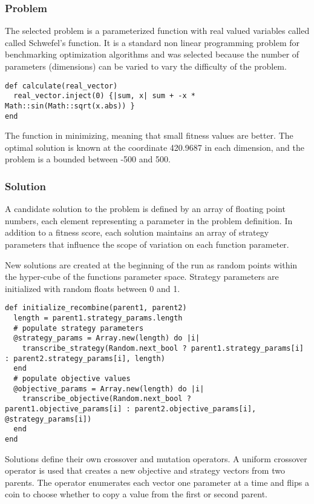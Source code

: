 \subsubsection{Problem}
The selected problem is a parameterized function with real valued variables called called Schwefel's function. It is a standard non linear programming problem for benchmarking optimization algorithms and was selected because the number of parameters (dimensions) can be varied to vary the difficulty of the problem.

\begin{lstlisting}
def calculate(real_vector)
  real_vector.inject(0) {|sum, x| sum + -x * Math::sin(Math::sqrt(x.abs)) }
end
\end{lstlisting}

The function in minimizing, meaning that small fitness values are better. The optimal solution is known at the coordinate 420.9687 in each dimension, and the problem is a bounded between -500 and 500. 

\subsubsection{Solution}
A candidate solution to the problem is defined by an array of floating point numbers, each element representing a parameter in the problem definition. In addition to a fitness score, each solution maintains an array of strategy parameters that influence the scope of variation on each function parameter. 

New solutions are created at the beginning of the run as random points within the hyper-cube of the functions parameter space. Strategy parameters are initialized with random floats between 0 and 1. 

\begin{lstlisting}
def initialize_recombine(parent1, parent2)
  length = parent1.strategy_params.length
  # populate strategy parameters
  @strategy_params = Array.new(length) do |i|
    transcribe_strategy(Random.next_bool ? parent1.strategy_params[i] : parent2.strategy_params[i], length)
  end
  # populate objective values
  @objective_params = Array.new(length) do |i|
    transcribe_objective(Random.next_bool ? parent1.objective_params[i] : parent2.objective_params[i], @strategy_params[i])
  end
end
\end{lstlisting}

Solutions define their own crossover and mutation operators. A uniform crossover operator is used that creates a new objective and strategy vectors from two parents. The operator enumerates each vector one parameter at a time and flips a coin to choose whether to copy a value from the first or second parent.

